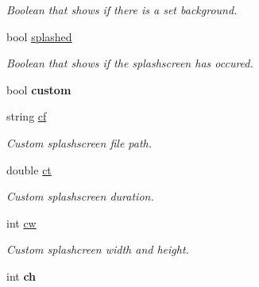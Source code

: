\begin{DoxyCompactItemize}
\begin{DoxyCompactList}\small\item\em Boolean that shows if there is a set background. \end{DoxyCompactList}\item 
bool \hyperlink{classEngine_aebef67a62082435a9bd7d2b3a70889b4}{splashed}\hypertarget{classEngine_aebef67a62082435a9bd7d2b3a70889b4}{}\label{classEngine_aebef67a62082435a9bd7d2b3a70889b4}

\begin{DoxyCompactList}\small\item\em Boolean that shows if the splashscreen has occured. \end{DoxyCompactList}\item 
bool {\bfseries custom}\hypertarget{classEngine_a571947abb4b69c3f9fbe81d8135829e8}{}\label{classEngine_a571947abb4b69c3f9fbe81d8135829e8}

\item 
string \hyperlink{classEngine_af5917b4f27bb16bf68b074b62c0e5587}{cf}\hypertarget{classEngine_af5917b4f27bb16bf68b074b62c0e5587}{}\label{classEngine_af5917b4f27bb16bf68b074b62c0e5587}

\begin{DoxyCompactList}\small\item\em Custom splashscreen file path. \end{DoxyCompactList}\item 
double \hyperlink{classEngine_a6e76eccd4f6e976a2068b9eb0acb4e85}{ct}\hypertarget{classEngine_a6e76eccd4f6e976a2068b9eb0acb4e85}{}\label{classEngine_a6e76eccd4f6e976a2068b9eb0acb4e85}

\begin{DoxyCompactList}\small\item\em Custom splashscreen duration. \end{DoxyCompactList}\item 
int \hyperlink{classEngine_aff6e103dd58c2ea3b7798e7bc52db361}{cw}\hypertarget{classEngine_aff6e103dd58c2ea3b7798e7bc52db361}{}\label{classEngine_aff6e103dd58c2ea3b7798e7bc52db361}

\begin{DoxyCompactList}\small\item\em Custom splashcreen width and height. \end{DoxyCompactList}\item 
int {\bfseries ch}\hypertarget{classEngine_a2acd0bd074160e654d076376d36a3479}{}\label{classEngine_a2acd0bd074160e654d076376d36a3479}

\end{DoxyCompactItemize}


